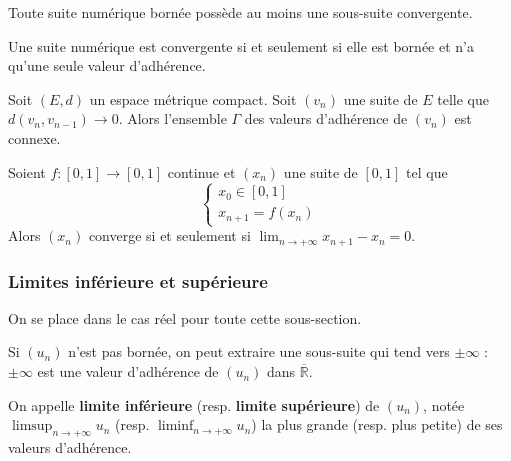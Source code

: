 	
	\begin{theorem}
		Toute suite numérique bornée possède au moins une sous-suite convergente.
	\end{theorem}
	
	
	\begin{proposition}
		Une suite numérique est convergente si et seulement si elle est bornée et n'a qu'une seule valeur d'adhérence.
	\end{proposition}
	
	
	\begin{application}
		Soit $(E, d)$ un espace métrique compact. Soit $(v_n)$ une suite de $E$ telle que $d(v_n,v_{n-1}) \longrightarrow 0$. Alors l'ensemble $\Gamma$ des valeurs d'adhérence de $(v_n)$ est connexe.
	\end{application}
	
	\begin{corollary}
		Soient $f : [0, 1] \rightarrow [0, 1]$ continue et $(x_n)$ une suite de $[0, 1]$ tel que
		\[ \begin{cases} x_0 \in [0, 1] \\ x_{n+1} = f(x_n) \end{cases} \]
		Alors $(x_n)$ converge si et seulement si $\lim_{n \rightarrow +\infty } x_{n+1} - x_n = 0$.
	\end{corollary}
	
	\subsubsection{Limites inférieure et supérieure}
	
	
	On se place dans le cas réel pour toute cette sous-section.
	
	\begin{lemma}
		Si $(u_n)$ n'est pas bornée, on peut extraire une sous-suite qui tend vers $\pm \infty$ : $\pm \infty$ est une valeur d'adhérence de $(u_n)$ dans $\overline{\mathbb{R}}$.
	\end{lemma}
	
	\begin{definition}
		On appelle \textbf{limite inférieure} (resp. \textbf{limite supérieure}) de $(u_n)$, notée $\limsup_{n \rightarrow +\infty} u_n$ (resp. $\liminf_{n \rightarrow +\infty} u_n$) la plus grande (resp. plus petite) de ses valeurs d'adhérence.
	\end{definition}
	
